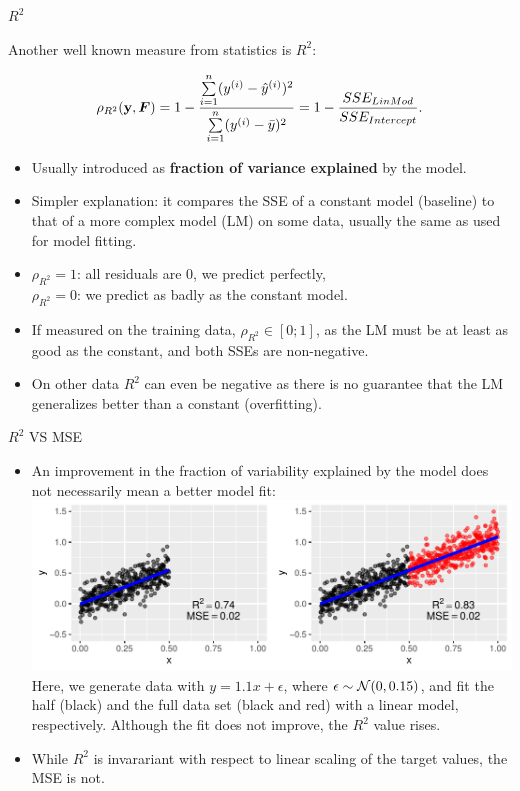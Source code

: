 \begin{vbframe}{$R^2$}
\begin{small}
Another well known measure from statistics is $R^2$:

\[
\rho_{R^2}(\mathbf{y}, \boldsymbol{F}) = 1 - \frac{\sum\limits_{i=1}^n (y^{(i)} - \hat{y}^{(i)})^2}{\sum\limits_{i=1}^n (y^{(i)} - \bar{y})^2} = 1 - \frac{SSE_{LinMod}}{SSE_{Intercept}}.
\]

\begin{itemize}
  \item Usually introduced as \textbf{fraction of variance explained} by the 
  model.
  \item Simpler explanation: it compares the SSE of a constant model (baseline) 
  to that of a more complex model (LM) on some data, usually the same as used 
  for model fitting.
  \item $\rho_{R^2}=1$: all residuals are 0, we predict perfectly, \\
  $\rho_{R^2}=0$: we predict as badly as the constant model.
  \item If measured on the training data, $\rho_{R^2} \in [0;1]$, as the LM must be at 
  least as good as the constant, and both SSEs are non-negative.
  \item On other data $R^2$ can even be negative as there is no guarantee that 
  the LM generalizes better than a constant (overfitting).
\end{itemize}
\end{small}
\end{vbframe}


\begin{vbframe}{$R^2$ VS MSE}
\begin{small}
\begin{itemize}
\item An improvement in the fraction of variability explained by the model does not 
necessarily mean a better model fit:
\includegraphics[width=\textwidth]{figure/eval_mse_r2}
Here, we generate data with $y = 1.1x + \epsilon$, where $\epsilon \sim \mathcal{N}(0, 0.15)$, and fit the half (black) and the full data set (black and red) with a linear model, respectively. Although the fit does not improve, the $R^2$ value rises.
\item While $R^2$ is invarariant with respect to linear scaling of the target values, the MSE is not.
\end{itemize}
\end{small}
\end{vbframe}

